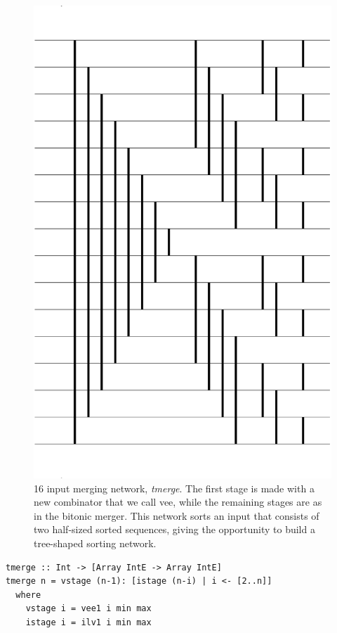 \documentclass[]{sigplanconf}
\begin{document}
\begin{figure}
\centering
\includegraphics[scale=0.25]{mixed}
\caption{16 input merging network, {\em tmerge}. The first stage
is made with a new combinator that we call vee, while
the remaining stages are as in the bitonic merger.
This network sorts an input that consists of two half-sized
sorted sequences, giving the opportunity to build a tree-shaped
sorting network.}
\label{fig:mixedMerger}
\end{figure}

\begin{codesize}
\begin{verbatim}
tmerge :: Int -> [Array IntE -> Array IntE]
tmerge n = vstage (n-1): [istage (n-i) | i <- [2..n]]
  where
    vstage i = vee1 i min max 
    istage i = ilv1 i min max
\end{verbatim}
\end{codesize}
\end{document}
